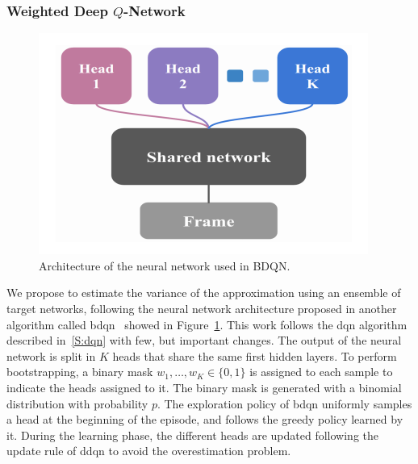 \subsubsection{Weighted Deep $Q$-Network}\label{S:drl}
\begin{figure}[t]
\begin{center}
  \includegraphics[scale=.5]{img/bdqn.png}
\end{center}
\caption[Boostrapped DQN network]{Architecture of the neural network used in BDQN.}\label{F:bdqn-net}
\end{figure}
We propose to estimate the variance of the approximation using an ensemble of target networks, following the neural network architecture proposed in another algorithm called \gls{bdqn}~\cite{osband2017deep} showed in Figure~\ref{F:bdqn-net}. This work follows the \gls{dqn} algorithm described in~\ref{S:dqn} with few, but important changes. The output of the neural network is split in $K$ heads that share the same first hidden layers. To perform bootstrapping, a binary mask $w_1, \dots, w_K \in \lbrace 0,1 \rbrace$ is assigned to each sample to indicate the heads assigned to it. The binary mask is generated with a binomial distribution with probability $p$. The exploration policy of \gls{bdqn} uniformly samples a head at the beginning of the episode, and follows the greedy policy learned by it. During the learning phase, the different heads are updated following the update rule of \gls{ddqn} to avoid the overestimation problem.

